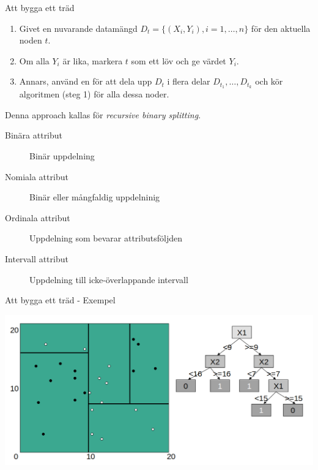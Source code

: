 \documentclass[10pt,english]{beamer}
\begin{document}
\begin{frame}{Att bygga ett träd}
    \begin{enumerate}
        \item Givet en nuvarande datamängd $D_t = \{(X_i, Y_i), i = 1,\ldots,n\}$ för den aktuella noden $t$.
        \item Om alla $Y_i$ är lika, markera $t$ som ett löv och ge värdet $Y_i$.
        \item Annars, använd en  för att dela upp $D_t$ i flera delar $D_{t_1}, \ldots, D_{t_k}$ och kör algoritmen (steg 1) för alla dessa noder.
    \end{enumerate}
    
    Denna approach kallas för \textit{recursive binary splitting}.
      
    \begin{description}
        \item[Binära attribut] Binär uppdelning
        \item[Nomiala attribut] Binär eller mångfaldig uppdelninig
        \item[Ordinala attribut] Uppdelning som bevarar attributsföljden
        \item[Intervall attribut] Uppdelning till icke-överlappande intervall
    \end{description}
\end{frame}

\begin{frame}{Att bygga ett träd - Exempel}

    \includegraphics[width=\textwidth]{figs/tree3.png}
    
\end{frame}
\end{document}
